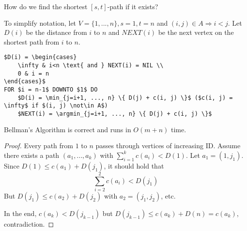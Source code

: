 \begin{qstn}
How do we find the shortest $[s, t]$-path if it exists?
\end{qstn}
To simplify notation, let $V = \{1, ..., n\}, s=1, t=n$ and $(i, j) \in A \Rightarrow i < j$.
Let $D(i)$ be the distance from $i$ to $n$ and $NEXT(i)$ be the next vertex on the shortest path from $i$ to $n$.

\begin{lstlisting}
$D(i) = \begin{cases}
	\infty & i<n \text{ and } NEXT(i) = NIL \\
	0 & i = n 
\end{cases}$
FOR $i = n-1$ DOWNTO $1$ DO
	$D(i) = \min_{j=i+1, ..., n} \{ D(j) + c(i, j) \}$ ($c(i, j) = \infty$ if $(i, j) \not\in A$)
	$NEXT(i) = \argmin_{j=i+1, ..., n} \{ D(j) + c(i, j) \}$
\end{lstlisting}

\begin{thm}
Bellman's Algorithm is correct and runs in $O(m + n)$ time.
\end{thm}
\begin{proof}
Every path from $1$ to $n$ passes through vertices of increasing ID. Assume there exists a path $(a_1, ..., a_k)$ with $\sum_{i=1}^k c(a_i) < D(1)$.
Let $a_1 = (1, j_1)$. Since $D(1) \leq c(a_1) + D(j_1)$, it should hold that
\[ \sum\limits_{i=2}^2 c(a_i) < D(j_1) \]
But $D(j_1) \leq c(a_2) + D(j_2)$ with $a_2 = (j_1, j_2)$, etc.

In the end, $c(a_k) < D(j_{k-1})$ but $D(j_{k-1}) \leq c(a_k) + D(n) = c(a_k)$, contradiction.
\end{proof}
